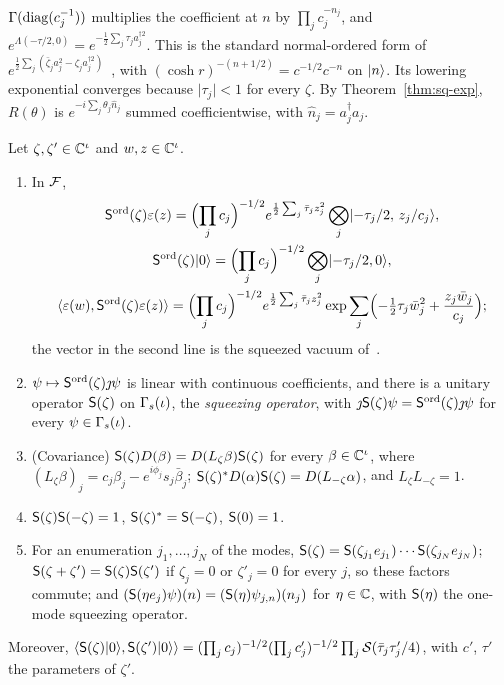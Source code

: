 \begin{veteenv}
$\Gamma(\operatorname{diag}(c_j^{-1}))$ multiplies the coefficient at $n$ by $\prod_jc_j^{-n_j}$, and $e^{\Lambda(-\tau/2,0)}=
e^{-\frac12\sum_j\tau_ja_j^{\dagger2}}$. This is the standard normal-ordered form of
$e^{\frac12\sum_j(\bar\zeta_ja_j^2-\zeta_ja_j^{\dagger2})}$~\cite{perelomov}, with $(\cosh r)^{-(n+1/2)}=c^{-1/2}c^{-n}$ on
$\lvert n\rangle$. Its lowering exponential converges because $\lvert\tau_j\rvert<1$ for every $\zeta$. By Theorem~\ref{thm:sq-exp},
$R(\theta)$ is $e^{-i\sum_j\theta_j\hat n_j}$ summed coefficientwise, with $\hat n_j=a_j^\dagger a_j$.

\begin{theorem}\label{thm:dsq-squeeze}
Let $\zeta,\zeta'\in\mathbb C^\iota$ and $w,z\in\mathbb C^\iota$.
\begin{enumerate}
\item[(a)] In $\mathcal F$,
\begin{gather*}
 \mathsf S^{\mathrm{ord}}(\zeta)\varepsilon(z)=\Bigl(\prod_jc_j\Bigr)^{-1/2}e^{\frac12\sum_j\bar\tau_jz_j^2}\bigotimes_j\lvert -\tau_j/2,\,z_j/c_j\rangle,\\
 \mathsf S^{\mathrm{ord}}(\zeta)\lvert 0\rangle=\Bigl(\prod_jc_j\Bigr)^{-1/2}\bigotimes_j\lvert -\tau_j/2,0\rangle,\\
 \langle\varepsilon(w),\mathsf S^{\mathrm{ord}}(\zeta)\varepsilon(z)\rangle=\Bigl(\prod_jc_j\Bigr)^{-1/2}e^{\frac12\sum_j\bar\tau_jz_j^2}
 \exp\sum_j\Bigl(-\tfrac12\tau_j\bar w_j^2+\frac{z_j\bar w_j}{c_j}\Bigr);
\end{gather*}
the vector in the second line is the squeezed vacuum of~\cite[(5)]{tjoacirac}.
\item[(b)] $\psi\mapsto\mathsf S^{\mathrm{ord}}(\zeta)\jmath\psi$ is linear with continuous coefficients, and there is a unitary
operator $\mathsf S(\zeta)$ on $\Gamma_s(\iota)$, the \emph{squeezing operator}, with $\jmath\mathsf S(\zeta)\psi=\mathsf S^{\mathrm{ord}}(\zeta)\jmath\psi$ for every $\psi\in\Gamma_s(\iota)$.
\item[(c)] (Covariance) $\mathsf S(\zeta)D(\beta)=D(L_\zeta\beta)\mathsf S(\zeta)$ for every $\beta\in\mathbb C^\iota$, where
$(L_\zeta\beta)_j=c_j\beta_j-e^{i\phi_j}s_j\bar\beta_j$; $\mathsf S(\zeta)^*D(\alpha)\mathsf S(\zeta)=D(L_{-\zeta}\alpha)$, and $L_\zeta L_{-\zeta}=1$.
\item[(d)] $\mathsf S(\zeta)\mathsf S(-\zeta)=1$, $\mathsf S(\zeta)^*=\mathsf S(-\zeta)$, $\mathsf S(0)=1$.
\item[(e)] For an enumeration $j_1,\ldots,j_N$ of the modes, $\mathsf S(\zeta)=\mathsf S(\zeta_{j_1}e_{j_1})\cdots\mathsf S(\zeta_{j_N}e_{j_N})$;
$\mathsf S(\zeta+\zeta')=\mathsf S(\zeta)\mathsf S(\zeta')$ if $\zeta_j=0$ or $\zeta'_j=0$ for every $j$, so these factors commute; and
$(\mathsf S(\eta e_j)\psi)(n)=(\mathsf S(\eta)\psi_{j,n})(n_j)$ for $\eta\in\mathbb C$, with $\mathsf S(\eta)$ the one-mode squeezing operator.
\end{enumerate}
Moreover, $\langle\mathsf S(\zeta)\lvert 0\rangle,\mathsf S(\zeta')\lvert 0\rangle\rangle=(\prod_jc_j)^{-1/2}(\prod_jc'_j)^{-1/2}\prod_j\mathcal S(\bar\tau_j\tau'_j/4)$, with $c'$,
$\tau'$ the parameters of $\zeta'$.
\end{theorem}


\end{veteenv}
